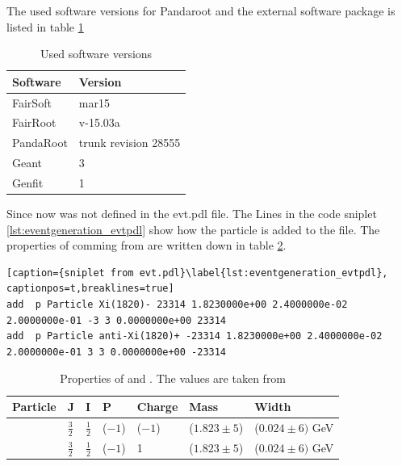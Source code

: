 The used software versions for Pandaroot and the external software package is listed in table \ref{tab:eventgeneration_software} 

\begin{table}[tb]
	\centering
	\caption{Used software versions}
	\label{tab:eventgeneration_software}
	\begin{tabular}{ll}
		\hline
		Software & Version \\
		\hline
		\hline
		FairSoft & mar15\\
		FairRoot & v-15.03a \\
		PandaRoot & trunk revision 28555 \\
		Geant & 3\\
		Genfit & 1\\\hline
			 
	\end{tabular}
\end{table}


Since now \excitedcascade was not defined in the evt.pdl file. 
The Lines in the code sniplet \ref{lst:eventgeneration_evtpdl} show how the particle is added to the file.
The properties of \excitedcascade comming from \cite{PDG} are written down in table \ref{tab:eventgeneration_Xivalues}.

\begin{lstlisting}[caption={sniplet from evt.pdl}\label{lst:eventgeneration_evtpdl}, captionpos=t,breaklines=true]
add  p Particle Xi(1820)- 23314 1.8230000e+00 2.4000000e-02 2.0000000e-01 -3 3 0.0000000e+00 23314
add  p Particle anti-Xi(1820)+ -23314 1.8230000e+00 2.4000000e-02 2.0000000e-01 3 3 0.0000000e+00 -23314
\end{lstlisting}

\begin{table}[htbp]
	\centering
	\caption{Properties of \excitedcascade and \excitedanticascade. The values are taken from \cite{PDG}}
	\label{tab:eventgeneration_Xivalues}
	\begin{tabular}{lllllll}
		\hline
		Particle & J & I & P & Charge & Mass  & Width \\
		\hline
		\hline
		\excitedcascade & $\frac{3}{2}$ & $\frac{1}{2}$ & ($-1$) & ($-1$) & ($1.823 \pm 5$)\massunit & ($0.024 \pm 6) $ GeV \\
		\excitedanticascade & $\frac{3}{2}$ & $\frac{1}{2}$ & ($-1$) & 1 & ($1.823 \pm 5$)\massunit & ($0.024 \pm 6) $ GeV\\
		\hline
		  
	\end{tabular}
\end{table}

